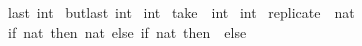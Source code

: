 \begin{isabellebody}
\isamarkupfalse%
\ {\isachardoublequoteopen}last\ {\isacharparenleft}{\isacharparenleft}{}{\isacharcolon}{\isacharcolon}int{\isacharparenright}{\isacharhash}{}{\isacharhash}{}{\isacharhash}{\isacharbrackleft}{\isacharbrackright}{\isacharparenright}{\isachardoublequoteclose}\isanewline
{}\isamarkupfalse%
\ {\isachardoublequoteopen}butlast\ {\isacharparenleft}{\isacharparenleft}{}{\isacharcolon}{\isacharcolon}int{\isacharparenright}{\isacharhash}{}{\isacharhash}{}{\isacharhash}{\isacharbrackleft}{\isacharbrackright}{\isacharparenright}{\isachardoublequoteclose}\isanewline
\isanewline
{}\isamarkupfalse%
\ {\isachardoublequoteopen}{\isacharparenleft}{\isacharparenleft}{}{\isacharcolon}{\isacharcolon}int{\isacharparenright}{\isacharhash}{}{\isacharhash}{}{\isacharhash}{\isacharbrackleft}{\isacharbrackright}{\isacharparenright}{\isacharbang}{}{\isachardoublequoteclose}\isanewline
{}\isamarkupfalse%
\ {\isachardoublequoteopen}take\ {}\ {\isacharparenleft}{\isacharparenleft}{}{\isacharcolon}{\isacharcolon}int{\isacharparenright}{\isacharhash}{}{\isacharhash}{}{\isacharhash}{\isacharbrackleft}{\isacharbrackright}{\isacharparenright}{\isachardoublequoteclose}\isanewline
{}\isamarkupfalse%
\ {\isachardoublequoteopen}{\isacharparenleft}{\isacharparenleft}{}{\isacharcolon}{\isacharcolon}int{\isacharparenright}{\isacharhash}{}{\isacharhash}{}{\isacharhash}{\isacharbrackleft}{\isacharbrackright}{\isacharparenright}{\isacharbrackleft}{}{\isacharcolon}{\isacharequal}{}{}{\isacharbrackright}{\isachardoublequoteclose}\isanewline
{}\isamarkupfalse%
\ {\isachardoublequoteopen}replicate\ {}\ {\isacharparenleft}{}{\isacharcolon}{\isacharcolon}nat{\isacharparenright}{\isachardoublequoteclose}\isanewline
{}\isamarkupfalse%
\ {\isachardoublequoteopen}if\ {\isacharparenleft}{}{\isacharcolon}{\isacharcolon}nat{\isacharparenright}{\isachargreater}{}\ then\ {}{\isacharcolon}{\isacharcolon}nat\ else\ {\isacharparenleft}if\ {\isacharparenleft}{}{\isacharcolon}{\isacharcolon}nat{\isacharparenright}{\isachargreater}{}\ then\ {}\ else\ {}{\isacharparenright}{\isachardoublequoteclose}\isanewline
\isanewline
{}\isamarkupfalse%

\end{isabellebody}
